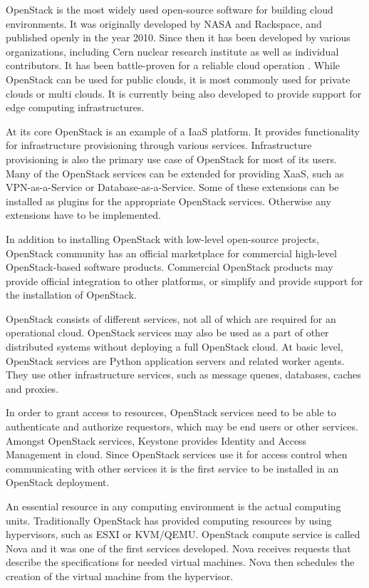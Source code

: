 OpenStack \cite{openstack} is the most widely used open-source software for
building cloud environments. It was originally developed by NASA and Rackspace,
and published openly in the year 2010. Since then it has been developed by
various organizations, including Cern nuclear research institute as well as
individual contributors. It has been battle-proven for a reliable cloud
operation \cite{forrester}. While OpenStack can be used for public clouds, it
is most commonly used for private clouds or multi clouds. It is currently being
also developed to provide support for edge computing infrastructures.

At its core OpenStack is an example of a IaaS platform. It provides
functionality for infrastructure provisioning through various services.
Infrastructure provisioning is also the primary use case of OpenStack for most
of its users. Many of the OpenStack services can be extended for providing
XaaS, such as VPN-as-a-Service or Database-as-a-Service. Some of these
extensions can be installed as plugins for the appropriate OpenStack services.
Otherwise any extensions have to be implemented.

In addition to installing OpenStack with low-level open-source projects,
OpenStack community has an official marketplace for commercial high-level
OpenStack-based software products. Commercial OpenStack products may provide
official integration to other platforms, or simplify and provide support for
the installation of OpenStack.

OpenStack consists of different services, not all of which are required for an
operational cloud. OpenStack services may also be used as a part of other
distributed systems without deploying a full OpenStack cloud. At basic level,
OpenStack services are Python application servers and related worker agents.
They use other infrastructure services, such as message queues, databases,
caches and proxies.

In order to grant access to resources, OpenStack services need to be able to
authenticate and authorize requestors, which may be end users or other
services. Amongst OpenStack services, Keystone provides Identity and Access
Management in cloud. Since OpenStack services use it for access control when
communicating with other services it is the first service to be installed in
an OpenStack deployment.

An essential resource in any computing environment is the actual computing
units. Traditionally OpenStack has provided computing resources by using
hypervisors, such as ESXI or KVM/QEMU. OpenStack compute service is called
Nova and it was one of the first services developed. Nova receives requests
that describe the specifications for needed virtual machines. Nova then
schedules the creation of the virtual machine from the hypervisor.

